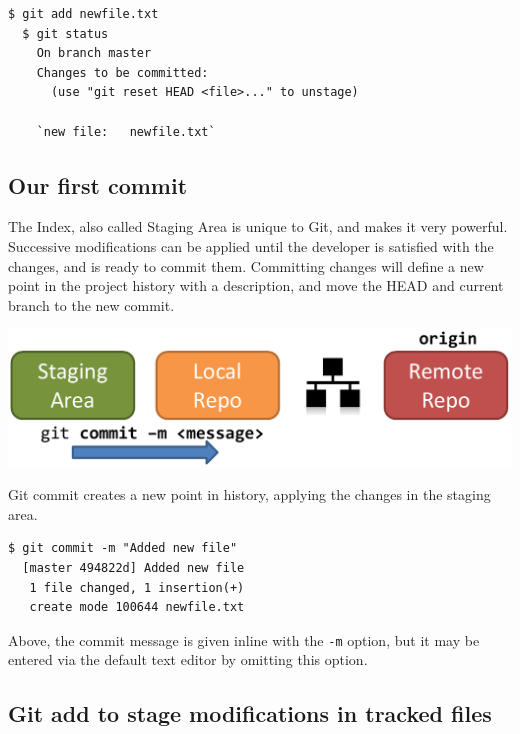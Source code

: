 \documentclass[a4paper]{../../common/tufte-latex/tufte-handout}
\begin{document}
\begin{lstlisting}[style=BashInputStyle]
  $ git add newfile.txt
  $ git status
    On branch master
    Changes to be committed:
      (use "git reset HEAD <file>..." to unstage)
  
    `new file:   newfile.txt`
\end{lstlisting}

\subsection{Our first commit}

The Index, also called Staging Area is unique to Git, and makes it very powerful.
Successive modifications can be applied until the developer is satisfied with the changes, and is ready to commit them.
Committing changes will define a new point in the project history with a description, and move the HEAD and current branch to the new commit.

\begin{marginfigure}%
  \centering
  \includegraphics[width=\linewidth]{gitcommit-schema.pdf}
  \label{fig:gitcommit}
  \caption{Git commit creates a new point in history, applying the changes in the staging area.}
\end{marginfigure}

\begin{lstlisting}[style=BashInputStyle]
  $ git commit -m "Added new file"
  [master 494822d] Added new file
   1 file changed, 1 insertion(+)
   create mode 100644 newfile.txt
\end{lstlisting}

Above, the commit message is given inline with the \texttt{-m} option, but it may be entered via the default text editor by omitting this option.

\subsection{Git add to stage modifications in tracked files}
\end{document}

